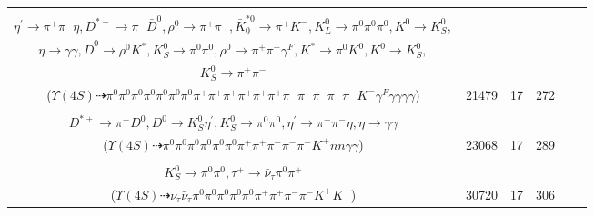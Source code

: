 \documentclass[landscape]{article}
\newcounter{rownumbers}
\newcommand\rn{\stepcounter{rownumbers}\arabic{rownumbers}}
\newcommand{\EOLP}{\\ \hline} %
\newcommand{\topoTags}[1]{#1} %
\begin{document}
\begin{longtable}{clcccc}
\rn & \makecell[l]{ $ 
\Upsilon(4S) \rightarrow B^{0} \bar{B}^{0} ,
B^{0} \rightarrow \pi^{0} \eta \bar{K}^{0} K^{*+} \eta^{\prime} D^{*-} ,
\bar{B}^{0} \rightarrow \rho^{0} \bar{K}_0^{*0} ,
\eta \rightarrow \gamma \gamma ,
\bar{K}^{0} \rightarrow K_{L}^{0} ,
K^{*+} \rightarrow \pi^{+} K^{0} ,
$ \\ $
\eta^{\prime} \rightarrow \pi^{+} \pi^{-} \eta ,
D^{*-} \rightarrow \pi^{-} \bar{D}^{0} ,
\rho^{0} \rightarrow \pi^{+} \pi^{-} ,
\bar{K}_0^{*0} \rightarrow \pi^{+} K^{-} ,
K_{L}^{0} \rightarrow \pi^{0} \pi^{0} \pi^{0} ,
K^{0} \rightarrow K_{S}^{0} ,
$ \\ $
\eta \rightarrow \gamma \gamma ,
\bar{D}^{0} \rightarrow \rho^{0} K^{*} ,
K_{S}^{0} \rightarrow \pi^{0} \pi^{0} ,
\rho^{0} \rightarrow \pi^{+} \pi^{-} \gamma^{F} ,
K^{*} \rightarrow \pi^{0} K^{0} ,
K^{0} \rightarrow K_{S}^{0} ,
$ \\ $
K_{S}^{0} \rightarrow \pi^{+} \pi^{-} 
$ \\ ($
\Upsilon(4S) \dashrightarrow \pi^{0} \pi^{0} \pi^{0} \pi^{0} \pi^{0} \pi^{0} \pi^{0} \pi^{+} \pi^{+} \pi^{+} \pi^{+} \pi^{+} \pi^{+} \pi^{-} \pi^{-} \pi^{-} \pi^{-} \pi^{-} K^{-} \gamma^{F} \gamma \gamma \gamma \gamma 
$) } & \topoTags{21479 & }17 & 272 \EOLP

\rn & \makecell[l]{ $ 
\Upsilon(4S) \rightarrow B^{0} \bar{B}^{0} ,
B^{0} \rightarrow \rho^{-} K^{*+} ,
\bar{B}^{0} \rightarrow \pi^{0} \rho^{-} D^{*+} n \bar{n} ,
\rho^{-} \rightarrow \pi^{0} \pi^{-} ,
K^{*+} \rightarrow \pi^{0} K^{+} ,
\rho^{-} \rightarrow \pi^{0} \pi^{-} ,
$ \\ $
D^{*+} \rightarrow \pi^{+} D^{0} ,
D^{0} \rightarrow K_{S}^{0} \eta^{\prime} ,
K_{S}^{0} \rightarrow \pi^{0} \pi^{0} ,
\eta^{\prime} \rightarrow \pi^{+} \pi^{-} \eta ,
\eta \rightarrow \gamma \gamma 
$ \\ ($
\Upsilon(4S) \dashrightarrow \pi^{0} \pi^{0} \pi^{0} \pi^{0} \pi^{0} \pi^{0} \pi^{+} \pi^{+} \pi^{-} \pi^{-} \pi^{-} K^{+} n \bar{n} \gamma \gamma 
$) } & \topoTags{23068 & }17 & 289 \EOLP

\rn & \makecell[l]{ $ 
\Upsilon(4S) \rightarrow B^{0} \bar{B}^{0} ,
B^{0} \rightarrow \pi^{0} D^{-} D_{s}^{+} ,
\bar{B}^{0} \rightarrow K^{+} K^{*-} ,
D^{-} \rightarrow \pi^{+} \pi^{-} \pi^{-} K_{S}^{0} ,
D_{s}^{+} \rightarrow \tau^{+} \nu_{\tau} ,
K^{*-} \rightarrow \pi^{0} K^{-} ,
$ \\ $
K_{S}^{0} \rightarrow \pi^{0} \pi^{0} ,
\tau^{+} \rightarrow \bar{\nu}_{\tau} \pi^{0} \pi^{+} 
$ \\ ($
\Upsilon(4S) \dashrightarrow \nu_{\tau} \bar{\nu}_{\tau} \pi^{0} \pi^{0} \pi^{0} \pi^{0} \pi^{0} \pi^{+} \pi^{+} \pi^{-} \pi^{-} K^{+} K^{-} 
$) } & \topoTags{30720 & }17 & 306 \EOLP


\end{longtable}
\end{document}
